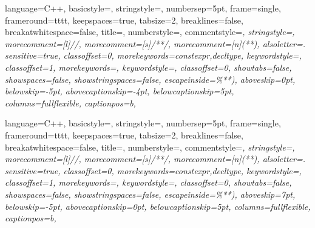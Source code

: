 { %
	language=C++,
	basicstyle=\small\ttfamily\singlespacing,%
	stringstyle=\color{white}\small\ttfamily,
	numbersep=5pt,
	frame=single,
	frameround={tttt},
	keepspaces=true,
	tabsize=2,
	breaklines=false,
	breakatwhitespace=false,
	title=\lstname,
	numberstyle=\tiny\color{black},
	commentstyle=\small\ttfamily\itshape\color{gray},
	stringstyle=\small\ttfamily\color{mauve},
	morecomment=[l]{//},
	morecomment=[s]{/*}{*/},
	morecomment=[n]{(*}{*)},
	alsoletter={.}
	sensitive=true,
	classoffset=0,
	morekeywords={constexpr,decltype},
	keywordstyle=\small\color{Yellow4},
	classoffset=1,
	morekeywords={}, 	
	keywordstyle=\small\color{Magenta4},
	classoffset=0,
	showtabs=false,
	showspaces=false,
	showstringspaces=false,  
	escapeinside={\%*}{*)},
	aboveskip=0pt,
	belowskip=-5pt, 
	abovecaptionskip=-4pt, 
	belowcaptionskip=5pt,
	columns=fullflexible,
	captionpos=b,
}


{ %
	language=C++,
	basicstyle=\scriptsize\ttfamily\singlespacing,%
	stringstyle=\color{white}\small\ttfamily,
	numbersep=5pt,
	frame=single,
	frameround={tttt},
	keepspaces=true,
	tabsize=2,
	breaklines=false,
	breakatwhitespace=false,
	title=\lstname,
	numberstyle=\tiny\color{black},
	commentstyle=\scriptsize\ttfamily\itshape\color{gray},
	stringstyle=\scriptsize\ttfamily\color{mauve},
	morecomment=[l]{//},
	morecomment=[s]{/*}{*/},
	morecomment=[n]{(*}{*)},
	alsoletter={.}
	sensitive=true,
	classoffset=0,
	morekeywords={constexpr,decltype},
	keywordstyle=\scriptsize\color{Yellow4},
	classoffset=1,
	morekeywords={}, 	
	keywordstyle=\scriptsize\color{Magenta4},
	classoffset=0,
	showtabs=false,
	showspaces=false,
	showstringspaces=false,  
	escapeinside={\%*}{*)},
	aboveskip=7pt,
	belowskip=-5pt, 
	abovecaptionskip=0pt, 
	belowcaptionskip=5pt,
	columns=fullflexible,
	captionpos=b,
}


